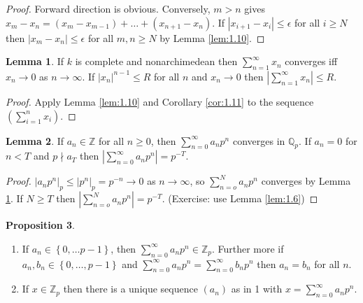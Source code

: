 \documentclass{article}
\newcommand{\Z}{\mathbb{Z}}
\newcommand{\Q}{\mathbb{Q}}
\newcommand{\rb}[1]{\left( #1 \right)}
\newcommand{\cb}[1]{\left\{ #1 \right\}}
\newcommand{\abs}[1]{\left\lvert #1 \right\rvert}
\theoremstyle{definition}\newtheorem{definition}{Definition}[section]
\theoremstyle{definition}\newtheorem{remark}[definition]{Remark}
\theoremstyle{definition}\newtheorem*{example}{Example}
\theoremstyle{definition}\newtheorem*{note}{Note}
\newtheorem{proposition}[definition]{Proposition}
\newtheorem{lemma}[definition]{Lemma}
\begin{document}
\begin{proof}
Forward direction is obvious. Conversely, $ m > n $ gives $ x_m - x_n = \rb{x_m - x_{m - 1}} + \dots + \rb{x_{n + 1} - x_n} $. If $ \abs{x_{i + 1} - x_i} \le \epsilon $ for all $ i \ge N $ then $ \abs{x_m - x_n} \le \epsilon $ for all $ m, n \ge N $ by Lemma \ref{lem:1.10}.
\end{proof}

\begin{lemma}
\label{lem:1.12}
If $ k $ is complete and nonarchimedean then $ \sum_{n = 1}^\infty x_n $ converges iff $ x_n \to 0 $ as $ n \to \infty $. If $ \abs{x_n}^{n - 1} \le R $ for all $ n $ and $ x_n \to 0 $ then $ \abs{\sum_{n = 1}^\infty x_n} \le R $.
\end{lemma}

\begin{proof}
Apply Lemma \ref{lem:1.10} and Corollary \ref{cor:1.11} to the sequence $ \rb{\sum_{i = 1}^n x_i} $.
\end{proof}

\begin{lemma}
\label{lem:1.13}
If $ a_n \in \Z $ for all $ n \ge 0 $, then $ \sum_{n = 0}^\infty a_np^n $ converges in $ \Q_p $. If $ a_n = 0 $ for $ n < T $ and $ p \nmid a_T $ then $ \abs{\sum_{n = 0}^\infty a_np^n} = p^{-T} $.
\end{lemma}

\begin{proof}
$ \abs{a_np^n}_p \le \abs{p^n}_p = p^{-n} \to 0 $ as $ n \to \infty $, so $ \sum_{n = o}^N a_np^n $ converges by Lemma \ref{lem:1.12}. If $ N \ge T $ then $ \abs{\sum_{n = o}^N a_np^n} = p^{-T} $. (Exercise: use Lemma \ref{lem:1.6})
\end{proof}

\begin{proposition}
\label{prop:1.14}
\hfill
\begin{enumerate}
\item If $ a_n \in \cb{0, \dots p - 1} $, then $ \sum_{n = 0}^\infty a_np^n \in \Z_p $. Further more if $ a_n, b_n \in \cb{0, \dots, p - 1} $ and $ \sum_{n = 0}^\infty a_np^n = \sum_{n = 0}^\infty b_np^n $ then $ a_n = b_n $ for all $ n $.
\item If $ x \in \Z_p $ then there is a unique sequence $ \rb{a_n} $ as in 1 with $ x = \sum_{n = 0}^\infty a_np^n $.
\end{enumerate}
\end{proposition}
\end{document}
